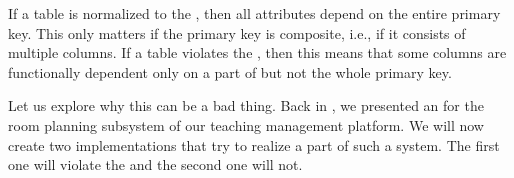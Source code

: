 %
%
If a table is normalized to the , then all attributes depend on the entire primary key.
This only matters if the primary key is composite, i.e., if it consists of multiple columns.
If a table violates the , then this means that some columns are functionally dependent only on a part of but not the whole primary key.

Let us explore why this can be a bad thing.
Back in , we presented an  for the room planning subsystem of our teaching management platform.
We will now create two implementations that try to realize a part of such a system.
The first one will violate the  and the second one will not.%
%
%
%
%
\endhsection%
%
